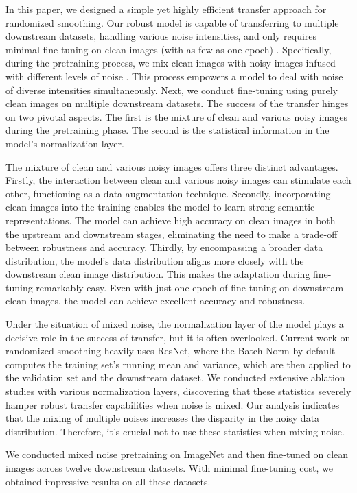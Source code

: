 In this paper, we designed a simple yet highly efficient transfer approach for randomized smoothing.
Our robust model is capable of transferring to multiple downstream datasets, handling various noise intensities, and only requires minimal fine-tuning on clean images (with as few as one epoch) .
Specifically, during the pretraining process, we mix clean images with noisy images infused with different levels of noise . 
This process empowers a model to deal with noise of diverse intensities simultaneously.
Next, we conduct fine-tuning using purely clean images on multiple downstream datasets.
The success of the transfer hinges on two pivotal aspects. 
The first is the mixture of clean and various noisy images during the pretraining phase.
The second is the statistical information in the model's normalization layer.


The mixture of clean and various noisy images offers three distinct advantages.
Firstly, the interaction between clean and various noisy images can stimulate each other, functioning as a data augmentation technique.
Secondly, incorporating clean images into the training enables the model to learn strong semantic representations.
The model can achieve high accuracy on clean images in both the upstream and downstream stages, eliminating the need to make a trade-off between robustness and accuracy.
Thirdly, by encompassing a broader data distribution, the model's data distribution aligns more closely with the downstream clean image distribution. 
This makes the adaptation during fine-tuning remarkably easy. 
Even with just one epoch of fine-tuning on downstream clean images, the model can achieve excellent accuracy and robustness.


Under the situation of mixed noise, the normalization layer of the model plays a decisive role in the success of  transfer, but it is often overlooked.
Current work on randomized smoothing heavily uses ResNet, where the Batch Norm by default computes the training set's running mean and variance, which are then applied to the validation set and the downstream dataset.
We conducted extensive ablation studies with various normalization layers, discovering that these statistics severely hamper robust transfer capabilities when noise is mixed.
Our analysis indicates that the mixing of multiple noises increases the disparity in the noisy data distribution.
Therefore, it's crucial not to use these statistics when mixing noise.


We conducted mixed noise pretraining on ImageNet and then fine-tuned on clean images across twelve downstream datasets. With minimal fine-tuning cost, we obtained impressive results on all these datasets.

